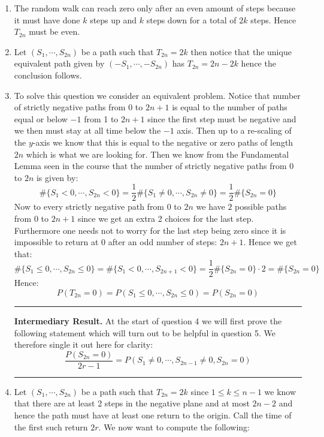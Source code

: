 \documentclass[10pt,a4paper]{article}
\begin{document}
\begin{enumerate}

\item The random walk can reach zero only after an even amount of steps because it must have done $k$ steps up and $k$ steps down for a total of $2k$ steps. Hence $T_{2n}$ must be even.

\item Let $(S_1, \cdots, S_{2n})$ be a path such that $T_{2n} = 2k$ then notice that the unique equivalent path given by $(-S_1, \cdots, -S_{2n})$ has $T_{2n} = 2n - 2k$ hence the conclusion follows.

\item To solve this question we consider an equivalent problem. Notice that number of strictly negative paths from 0 to $2n + 1$ is equal to the number of paths equal or below $-1$ from 1 to $2n + 1$ since the first step must be negative and we then must stay at all time below the $-1$ axis. Then up to a re-scaling of the $y$-axis we know that this is equal to the negative or zero paths of length $2n$ which is what we are looking for. Then we know from the Fundamental Lemma seen in the course that the number of strictly negative paths from $0$ to $2n$ is given by:
\[
\#\{S_1 < 0, \cdots, S_{2n} < 0\} = \frac{1}{2}\#\{S_1 \neq 0, \cdots, S_{2n} \neq 0\} = \frac{1}{2}\#\{S_{2n} = 0\}
\] 
Now to every strictly negative path from $0$ to $2n$ we have $2$ possible paths from $0$ to $2n+1$ since we get an extra 2 choices for the last step. Furthermore one needs not to worry for the last step being zero since it is impossible to return at 0 after an odd number of steps: $2n+1$. Hence we get that:
\[
\#\{ S_1 \leq 0, \cdots, S_{2n} \leq 0 \} = \#\{ S_1 < 0, \cdots, S_{2n + 1} < 0 \} = \frac{1}{2}\#\{S_{2n} = 0\} \cdot 2 = \#\{S_{2n} = 0\}
\]
Hence:
\[
P(T_{2n} = 0) = P(S_1 \leq 0, \cdots, S_{2n} \leq 0) = P(S_{2n} = 0)
\]
\vspace{1cm}
\hrule
\textbf{Intermediary Result.} At the start of question 4 we will first prove the following statement which will turn out to be helpful in question 5. We therefore single it out here for clarity:
\[
\frac{P(S_{2n} = 0)}{2r - 1} = P(S_1 \neq 0, \cdots, S_{2n-1} \neq 0, S_{2n} = 0)
\]
\hrule
\vspace{1cm}
\item Let $(S_1, \cdots, S_{2n})$ be a path such that $T_{2n} = 2k$ since $ 1 \leq k \leq n - 1$ we know that there are at least 2 steps in the negative plane and at most $2n-2$ and hence the path must have at least one return to the origin. Call the time of the first such return $2r$. We now want to compute the following:

\end{enumerate}
\end{document}
